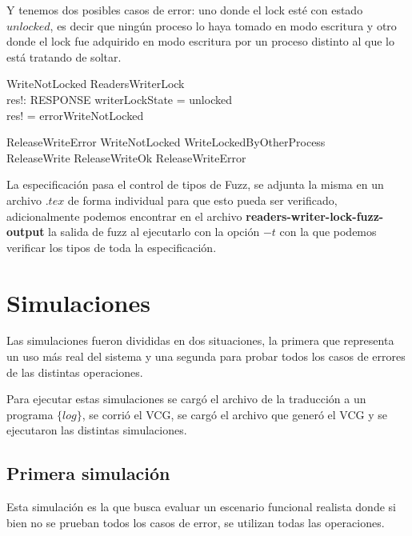 \documentclass[a4paper, 12pt]{article}
\begin{document}
Y tenemos dos posibles casos de error: uno donde el lock esté con estado $unlocked$, es decir que ningún proceso lo haya tomado en modo escritura y otro donde el lock fue adquirido en modo escritura por un proceso distinto al que lo está tratando de soltar.

\begin{schema}{WriteNotLocked}
    \Xi ReadersWriterLock \\
    res!: RESPONSE
\where
    writerLockState = unlocked \\
    res! = errorWriteNotLocked
\end{schema}

\begin{zed}
ReleaseWriteError  WriteNotLocked \lor WriteLockedByOtherProcess 
\\
ReleaseWrite  ReleaseWriteOk \lor ReleaseWriteError
\end{zed}

La especificación pasa el control de tipos de Fuzz, se adjunta la misma en un archivo $.tex$ de forma individual para que esto pueda ser verificado, adicionalmente podemos encontrar en el archivo \textbf{readers-writer-lock-fuzz-output} la salida de fuzz al ejecutarlo con la opción $-t$ con la que podemos verificar los tipos de toda la especificación.

\section{Simulaciones}
Las simulaciones fueron divididas en dos situaciones, la primera que representa un uso más real del sistema y una segunda para probar todos los casos de errores de las distintas operaciones.

Para ejecutar estas simulaciones se cargó el archivo de la traducción a un programa $\{log\}$, se corrió el VCG, se cargó el archivo que generó el VCG y se ejecutaron las distintas simulaciones.
\subsection{Primera simulación}
Esta simulación es la que busca evaluar un escenario funcional realista donde si bien no se prueban todos los casos de error, se utilizan todas las operaciones.
\end{document}
